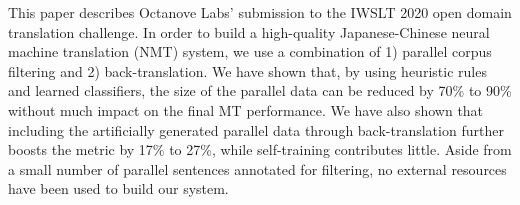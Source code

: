 This paper describes Octanove Labs' submission to the IWSLT 2020 open domain translation challenge. In order to build a high-quality Japanese-Chinese neural machine translation (NMT) system, we use a combination of 1) parallel corpus filtering and 2) back-translation. We have shown that, by using heuristic rules and learned classifiers, the size of the parallel data can be reduced by 70\% to 90\% without much impact on the final MT performance. We have also shown that including the artificially generated parallel data through back-translation further boosts the metric by 17\% to 27\%, while self-training contributes little. Aside from a small number of parallel sentences annotated for filtering, no external resources have been used to build our system.
